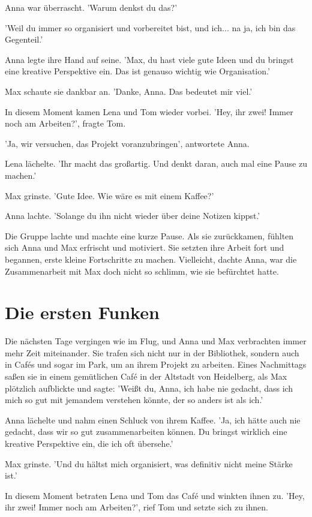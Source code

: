 \documentclass[12pt]{article}
\begin{document}
Anna war überrascht. 'Warum denkst du das?'

'Weil du immer so organisiert und vorbereitet bist, und ich... na ja, ich bin das Gegenteil.'

Anna legte ihre Hand auf seine. 'Max, du hast viele gute Ideen und du bringst eine kreative Perspektive ein. Das ist genauso wichtig wie Organisation.'

Max schaute sie dankbar an. 'Danke, Anna. Das bedeutet mir viel.'

In diesem Moment kamen Lena und Tom wieder vorbei. 'Hey, ihr zwei! Immer noch am Arbeiten?', fragte Tom.

'Ja, wir versuchen, das Projekt voranzubringen', antwortete Anna.

Lena lächelte. 'Ihr macht das großartig. Und denkt daran, auch mal eine Pause zu machen.'

Max grinste. 'Gute Idee. Wie wäre es mit einem Kaffee?'

Anna lachte. 'Solange du ihn nicht wieder über deine Notizen kippst.'

Die Gruppe lachte und machte eine kurze Pause. Als sie zurückkamen, fühlten sich Anna und Max erfrischt und motiviert. Sie setzten ihre Arbeit fort und begannen, erste kleine Fortschritte zu machen. Vielleicht, dachte Anna, war die Zusammenarbeit mit Max doch nicht so schlimm, wie sie befürchtet hatte.

\section{ Die ersten Funken }
 Die nächsten Tage vergingen wie im Flug, und Anna und Max verbrachten immer mehr Zeit miteinander. Sie trafen sich nicht nur in der Bibliothek, sondern auch in Cafés und sogar im Park, um an ihrem Projekt zu arbeiten. Eines Nachmittags saßen sie in einem gemütlichen Café in der Altstadt von Heidelberg, als Max plötzlich aufblickte und sagte: 'Weißt du, Anna, ich habe nie gedacht, dass ich mich so gut mit jemandem verstehen könnte, der so anders ist als ich.'

Anna lächelte und nahm einen Schluck von ihrem Kaffee. 'Ja, ich hätte auch nie gedacht, dass wir so gut zusammenarbeiten können. Du bringst wirklich eine kreative Perspektive ein, die ich oft übersehe.'

Max grinste. 'Und du hältst mich organisiert, was definitiv nicht meine Stärke ist.'

In diesem Moment betraten Lena und Tom das Café und winkten ihnen zu. 'Hey, ihr zwei! Immer noch am Arbeiten?', rief Tom und setzte sich zu ihnen.
\end{document}
